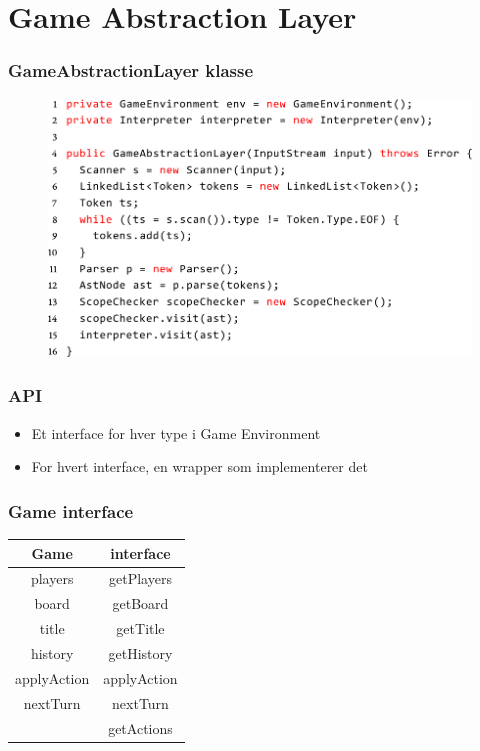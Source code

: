 \section{Game Abstraction Layer}


\begin{frame}
  \frametitle{GameAbstractionLayer klasse}

 	\begin{figure}
    	\includegraphics[width=0.8\linewidth]{billeder/gal_constructor_code.png}
 	\end{figure}
\end{frame}

\begin{frame}
  \frametitle{API}

  \begin{itemize}
    \item Et interface for hver type i Game Environment
    \item For hvert interface, en wrapper som implementerer det
  \end{itemize}
\end{frame}

\begin{frame}
  \frametitle{Game interface}

  \begin{tabular}{ c | c }
    Game & interface \\
    \hline
    players & getPlayers \\
    board & getBoard \\
    title & getTitle \\
    history & getHistory \\
    applyAction & applyAction \\
    nextTurn & nextTurn \\
     & getActions \\
  \end{tabular}
\end{frame}

